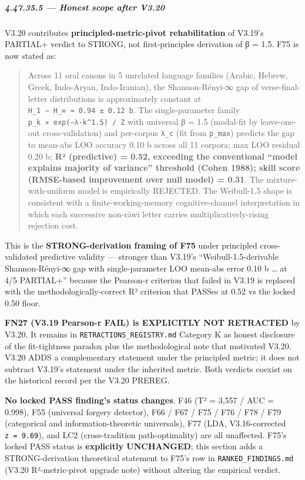 \documentclass[
]{article}
\begin{document}
\subparagraph{4.47.35.5 --- Honest scope after
V3.20}\label{honest-scope-after-v3.20}

V3.20 contributes \textbf{principled-metric-pivot rehabilitation} of
V3.19's PARTIAL+ verdict to STRONG, not first-principles derivation of β
= 1.5. F75 is now stated as:

\begin{quote}
Across 11 oral canons in 5 unrelated language families (Arabic, Hebrew,
Greek, Indo-Aryan, Indo-Iranian), the Shannon-Rényi-∞ gap of
verse-final-letter distributions is approximately constant at
\texttt{H\_1\ −\ H\_∞\ ≈\ 0.94\ ±\ 0.12\ b}. The single-parameter family
\texttt{p\_k\ ∝\ exp(−λ·k\^{}1.5)\ /\ Z} with universal β = 1.5
(modal-fit by leave-one-out cross-validation) and per-corpus
\texttt{λ\_c} (fit from \texttt{p\_max}) predicts the gap to mean-abs
LOO accuracy 0.10 b across all 11 corpora; max LOO residual 0.20 b;
\textbf{R² (predictive) = 0.52, exceeding the conventional ``model
explains majority of variance'' threshold (Cohen 1988); skill score
(RMSE-based improvement over null model) = 0.31}. The
mixture-with-uniform model is empirically REJECTED. The Weibull-1.5
shape is consistent with a finite-working-memory cognitive-channel
interpretation in which each successive non-rāwī letter carries
multiplicatively-rising rejection cost.
\end{quote}

This is the \textbf{STRONG-derivation framing of F75} under principled
cross-validated predictive validity --- stronger than V3.19's
``Weibull-1.5-derivable Shannon-Rényi-∞ gap with single-parameter LOO
mean-abs error 0.10 b \ldots{} at 4/5 PARTIAL+'' because the Pearson-r
criterion that failed in V3.19 is replaced with the
methodologically-correct R² criterion that PASSes at 0.52 vs the locked
0.50 floor.

\textbf{FN27 (V3.19 Pearson-r FAIL) is EXPLICITLY NOT RETRACTED} by
V3.20. It remains in \texttt{RETRACTIONS\_REGISTRY.md} Category K as
honest disclosure of the fit-tightness paradox plus the methodological
note that motivated V3.20. V3.20 ADDS a complementary statement under
the principled metric; it does not subtract V3.19's statement under the
inherited metric. Both verdicts coexist on the historical record per the
V3.20 PREREG.

\textbf{No locked PASS finding's status changes}. F46 (T² = 3,557 / AUC
= 0.998), F55 (universal forgery detector), F66 / F67 / F75 / F76 / F78
/ F79 (categorical and information-theoretic universals), F77 (LDA,
V3.16-corrected \texttt{\textbar{}z\textbar{}\ =\ 9.69}), and LC2
(cross-tradition path-optimality) are all unaffected. F75's locked PASS
status is \textbf{explicitly UNCHANGED}; this section adds a
STRONG-derivation theoretical statement to F75's row in
\texttt{RANKED\_FINDINGS.md} (V3.20 R²-metric-pivot upgrade note)
without altering the empirical verdict.
\end{document}
